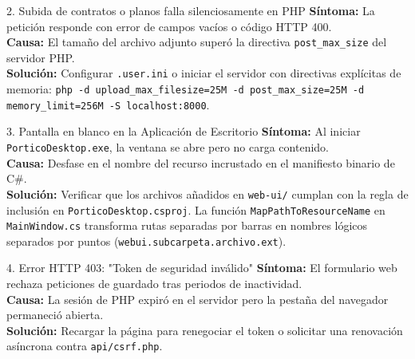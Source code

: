 \documentclass[11pt,a4paper,openany]{report}
\begin{document}
\begin{modernbox}{2. Subida de contratos o planos falla silenciosamente en PHP}
\textbf{Síntoma:} La petición responde con error de campos vacíos o código HTTP 400.\\
\textbf{Causa:} El tamaño del archivo adjunto superó la directiva \texttt{post\_max\_size} del servidor PHP.\\
\textbf{Solución:} Configurar \texttt{.user.ini} o iniciar el servidor con directivas explícitas de memoria:
\texttt{php -d upload\_max\_filesize=25M -d post\_max\_size=25M -d memory\_limit=256M -S localhost:8000}.
\end{modernbox}

\begin{modernbox}{3. Pantalla en blanco en la Aplicación de Escritorio}
\textbf{Síntoma:} Al iniciar \texttt{PorticoDesktop.exe}, la ventana se abre pero no carga contenido.\\
\textbf{Causa:} Desfase en el nombre del recurso incrustado en el manifiesto binario de C\#.\\
\textbf{Solución:} Verificar que los archivos añadidos en \texttt{web-ui/} cumplan con la regla de inclusión en \texttt{PorticoDesktop.csproj}. La función \texttt{MapPathToResourceName} en \texttt{MainWindow.cs} transforma rutas separadas por barras en nombres lógicos separados por puntos (\texttt{webui.subcarpeta.archivo.ext}).
\end{modernbox}

\begin{modernbox}{4. Error HTTP 403: "Token de seguridad inválido"}
\textbf{Síntoma:} El formulario web rechaza peticiones de guardado tras periodos de inactividad.\\
\textbf{Causa:} La sesión de PHP expiró en el servidor pero la pestaña del navegador permaneció abierta.\\
\textbf{Solución:} Recargar la página para renegociar el token o solicitar una renovación asíncrona contra \texttt{api/csrf.php}.
\end{modernbox}

\nocite{*}


\end{document}
